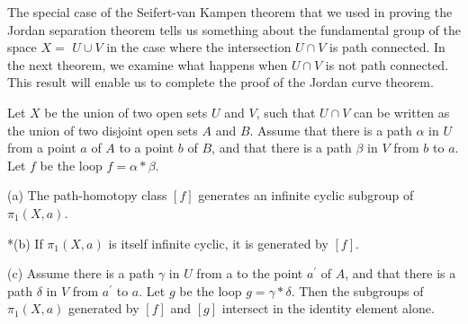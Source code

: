 The special case of the Seifert-van Kampen theorem that we used in proving the Jordan separation theorem tells us something about the fundamental group of the space \(X =\) \(U \cup V\) in the case where the intersection \(U \cap V\) is path connected. In the next theorem, we examine what happens when \(U \cap V\) is not path connected. This result will enable us to complete the proof of the Jordan curve theorem.

\begin{theorem}
\label{thm:\thetheorem}
Let \(X\) be the union of two open sets \(U\) and \(V\), such that \(U \cap V\) can be written as the union of two disjoint open sets \(A\) and \(B\). Assume that there is a path \(\alpha\) in \(U\) from a point \(a\) of \(A\) to a point \(b\) of \(B\), and that there is a path \(\beta\) in \(V\) from \(b\) to \(a\). Let \(f\) be the loop \(f = \alpha * \beta\).

(a) The path-homotopy class \([ f]\) generates an infinite cyclic subgroup of \({\pi }_{1}( {X,a})\).

*(b) If \({\pi }_{1}( {X,a})\) is itself infinite cyclic, it is generated by \([f].\)

(c) Assume there is a path \(\gamma\) in \(U\) from a to the point \(a^{\prime }\) of \(A\), and that there is a path \(\delta\) in \(V\) from \(a^{\prime }\) to \(a\). Let \(g\) be the loop \(g = \gamma * \delta\). Then the subgroups of \({\pi }_{1}( {X,a})\) generated by \([ f]\) and \([ g]\) intersect in the identity element alone.
\end{theorem}

